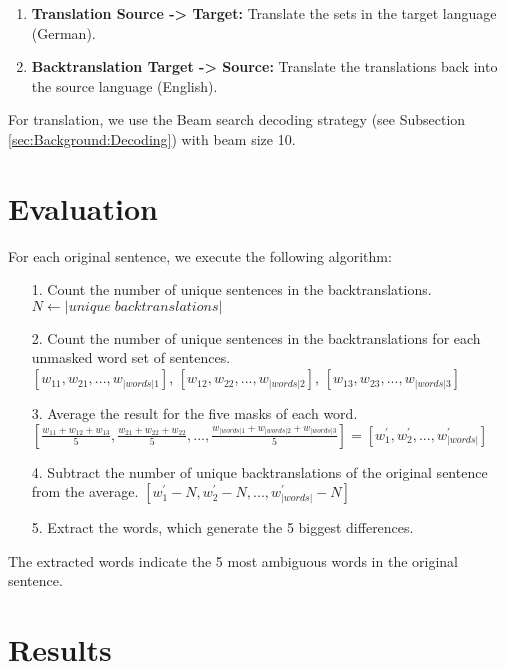 \begin{enumerate}
    \item \textbf{Translation Source -> Target:} Translate the sets in the target language (German).
    \item \textbf{Backtranslation Target -> Source:} Translate the translations back into the source language (English).
\end{enumerate}

For translation, we use the Beam search decoding strategy (see Subsection \ref{sec:Background:Decoding}) with beam size 10.

\section{Evaluation}
\label{sec:Real_Experiment:Evaluation}

For each original sentence, we execute the following algorithm:
\begin{enumerate}
    \item[1. ] Count the number of unique sentences in the backtranslations. \\
    $N \leftarrow |unique \; backtranslations|$ 
    \item[2. ] Count the number of unique sentences in the backtranslations for each unmasked word set of sentences. \\
    $[w_{11}, w_{21}, ..., w_{|words|1}]$, $[w_{12}, w_{22}, ...,  w_{|words|2}]$, $[w_{13}, w_{23}, ..., w_{|words|3}]$ 
    \item[3. ] Average the result for the five masks of each word. \\ %
    $[\frac{w_{11} + w_{12} + w_{13}}{5}, \frac{w_{21} + w_{22} + w_{22}}{5}, ...,  \frac{w_{|words|1} + w_{|words|2} + w_{|words|3}}{5}] = [w_{1}^{'}, w_{2}^{'}, ..., w_{|words|}^{'}]$
    \item[4. ] Subtract the number of unique backtranslations of the original sentence from the average.
    $[w_{1}^{'} - N, w_{2}^{'} - N, ..., w_{|words|}^{'} - N]$ 
    \item[5.] Extract the words, which generate the 5 biggest differences. 
    
\end{enumerate}


The extracted words indicate the 5 most ambiguous words in the original sentence.

\section{Results}
\label{sec:Real_Experiment:Results}




